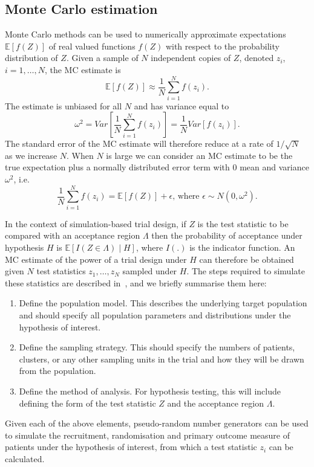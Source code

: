 \documentclass[sagev, Crown]{sagej}
\begin{document}
\subsection{Monte Carlo estimation}\label{sec:MC}

Monte Carlo methods can be used to numerically approximate expectations $\mathbb{E}[f(Z)]$ of real valued functions $f(Z)$ with respect to the probability distribution of $Z$. Given a sample of $N$ independent copies of $Z$, denoted $z_{i}$, $i=1, \ldots, N$, the MC estimate is
\begin{equation}
\mathbb{E}[f(Z)] \approx \frac{1}{N} \sum_{i=1}^{N} f(z_{i}).
\end{equation}
The estimate is unbiased for all $N$ and has variance equal to
\begin{equation}
\omega^{2} = Var \left[ \frac{1}{N} \sum_{i=1}^{N} f(z_{i}) \right] = \frac{1}{N} Var \left[ f(z_{i}) \right].
\end{equation}
The standard error of the MC estimate will therefore reduce at a rate of $1/\sqrt{N}$ as we increase $N$. When $N$ is large we can consider an MC estimate to be the true expectation plus a normally distributed error term with 0 mean and variance $\omega^{2}$, i.e.
\begin{equation}\label{eqn:MC_error}
\frac{1}{N} \sum_{i=1}^{N} f(z_{i}) = \mathbb{E}[f(Z)] + \epsilon \text{, where } \epsilon \sim N(0, \omega^{2}).
\end{equation}

In the context of simulation-based trial design, if $Z$ is the test statistic to be compared with an acceptance region $\Lambda$ then the probability of acceptance under hypothesis $H$ is $\mathbb{E}[I(Z \in \Lambda) \mid H]$, where $I(.)$ is the indicator function. An MC estimate of the power of a trial design under $H$ can therefore be obtained given $N$ test statistics $z_{1}, \ldots , z_{N}$ sampled under $H$. The steps required to simulate these statistics are described in~\cite{Landau2013}, and we briefly summarise them here:
\begin{enumerate}
\item Define the population model. This describes the underlying target population and should specify all population parameters and distributions under the hypothesis of interest.
\item Define the sampling strategy. This should specify the numbers of patients, clusters, or any other sampling units in the trial and how they will be drawn from the population.
\item Define the method of analysis. For hypothesis testing, this will include defining the form of the test statistic $Z$ and the acceptance region $\Lambda$.
\end{enumerate}
Given each of the above elements, pseudo-random number generators can be used to simulate the recruitment, randomisation and primary outcome measure of patients under the hypothesis of interest, from which a test statistic $z_{i}$ can be calculated. 
\end{document}
